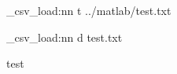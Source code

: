 \documentclass[11pt,a4paper,sans]{article}
\newcommand{\loadvariables}[2]{
	\krishna_csv_load:nn {#1} {#2} 
		
}
\begin{document}
	\loadvariables{t}{../matlab/test.txt}
	\loadvariables{d}{test.txt}
	test
	
	
	\tb
	
	\tc
	
	\tchr
	
	
	
	
	
\end{document}
